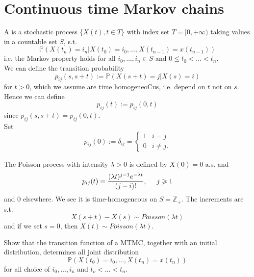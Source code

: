 \documentclass{article}
\begin{document}
	\section{Continuous time Markov chains}
	\begin{definition}
		A  is a stochastic process $\{X(t), t \in T\}$ with index set $T=[0,+ \infty)$ taking values in a countable set $S$, s.t. 
		\begin{equation*}
			\mathbb{P}(X(t_n)=i_n | X(t_0)=i_0, \dots, X(t_{n-1})= x(t_{n-1}))
		\end{equation*}
		i.e. the Markov property holds for all $i_0, \dots, i_n \in S$ and $0\leqslant t_0 < \dots < t_n$. \\
		We can define the transition probability 
		\begin{equation*}
			p_{ij}(s,s+t):= \mathbb{P}(X(s+t)=j|X(s)=i)
		\end{equation*}
		for $t>0$, which we assume are time homogeneoCus, i.e. depend on $t$ not on $s$. Hence we can define 
		\begin{equation*}
			p_{ij}(t):= p_{ij}(0,t)
		\end{equation*}
		since $p_{ij}(s,s+t)= p_{ij}(0,t)$.\\
		Set \[p_{ij}(0):=\delta_{ij}=\begin{cases}
			1 &i=j\\
			0 &i\neq j.
		\end{cases}\]
	\end{definition}
	\begin{example}
		The Poisson process with intensity $\lambda>0 $ is defined by $X(0)=0$ a.s. and 
		\begin{equation*}
			p_{ij}(t)= \frac{(\lambda t)^{j-1}e^{-\lambda t}}{(j-i)!}, \hspace{0.5 cm} j \geqslant 1
		\end{equation*}
		and $0$ elsewhere. We see it is time-homogeneous on $S = \mathbb{Z}_+$. The increments are s.t.
		\begin{equation*}
			X(s+t)-X(s) \sim Poisson (\lambda t)
		\end{equation*}
		and if we set $s=0$, then $X(t) \sim Poisson(\lambda t)$.
	\end{example}
	\begin{exercise}
		Show that the transition function of a MTMC, together with an initial distribution, determines all joint distribution 
		\begin{equation*}
			\mathbb{P}( X(t_0)=i_0, \dots, X(t_{n})= x(t_{n}))
		\end{equation*}
		for all choice of $i_0, \dots, i_n$ and $t_o <\dots < t_n$. \\
	\end{exercise}
\end{document}
